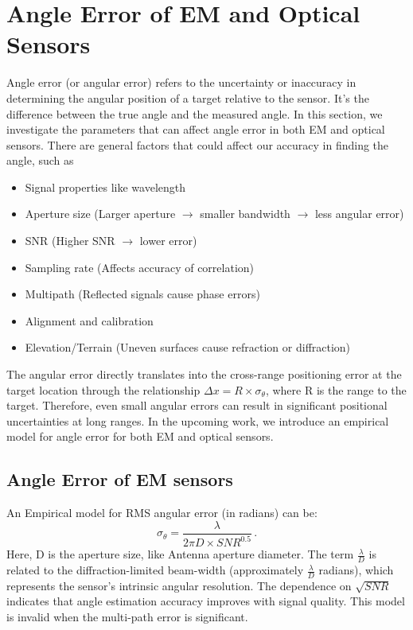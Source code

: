 \documentclass{article}
\begin{document}
 \section{Angle Error of EM and Optical Sensors}
Angle error (or angular error) refers to the uncertainty or inaccuracy in determining the angular position of a target relative to the sensor. It's the difference between the true angle and the measured angle. In this section, we investigate the parameters that can affect angle error in both EM and optical sensors.
There are general factors that could affect our accuracy in finding the angle, such as
\begin{itemize}
    \item Signal properties like wavelength
    \item Aperture size (Larger aperture $\rightarrow$ smaller bandwidth $\rightarrow$ less angular error)
    \item SNR (Higher SNR $\rightarrow$ lower error)
    \item Sampling rate (Affects accuracy of correlation)
    \item Multipath (Reflected signals cause phase errors)
    \item Alignment and calibration
    \item Elevation/Terrain (Uneven surfaces cause refraction or diffraction)
\end{itemize}
The angular error directly translates into the cross-range positioning error at the target location through the relationship $\Delta x = R \times \sigma_\theta$, where R is the range to the target. Therefore, even small angular errors can result in significant positional uncertainties at long ranges.
In the upcoming work, we introduce an empirical model for angle error for both EM and optical sensors. 
\subsection{Angle Error of EM sensors}
An Empirical model for RMS angular error (in radians) can be:
\begin{equation}
    \sigma_\theta=\frac{\lambda}{2\pi D\times S N R^{0.5}}\, .
\end{equation}
Here, D is the aperture size, like Antenna aperture diameter. The term $\frac{\lambda}{D}$ is related to the diffraction-limited beam-width (approximately $\frac{\lambda}{D}$ radians), which represents the sensor's intrinsic angular resolution. The dependence on $\sqrt{SNR}$ indicates that angle estimation accuracy improves with signal quality.
This model is invalid when the multi-path error is significant.
\end{document}
